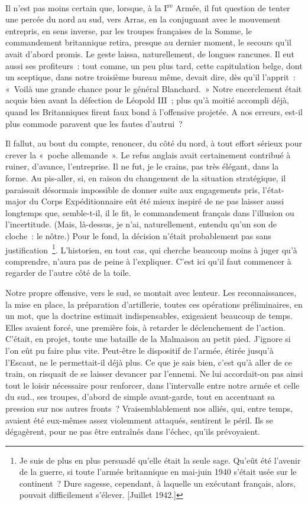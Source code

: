\documentclass[french,twoside]{book} %
\begin{document}
Il n’est pas moins certain que, lorsque, à la I\textsuperscript{re} Armée, il fut question de tenter une percée du nord au sud, vers Arras, en la conjuguant avec le mouvement entrepris, en sens inverse, par les troupes françaises de la Somme, le commandement britannique retira, presque au dernier moment, le secours qu’il avait d’abord promis. Le geste laissa, naturellement, de longues rancunes. Il eut aussi ses profiteurs : tout comme, un peu plus tard, cette capitulation belge, dont un sceptique, dans notre troisième bureau même, devait dire, dès qu’il l’apprit : « Voilà une grande chance pour le général Blanchard. » Notre encerclement était acquis bien avant la défection de Léopold III ; plus qu’à moitié accompli déjà, quand les Britanniques firent faux bond à l’offensive projetée. A nos erreurs, est-il plus commode paravent que les fautes d’autrui ?\par
Il fallut, au bout du compte, renoncer, du côté du nord, à tout effort sérieux pour crever la « poche allemande ». Le refus anglais avait certainement contribué à ruiner, d’avance, l’entreprise. Il ne fut, je le crains, pas très élégant, dans la forme. Au pis-aller, si, en raison du changement de la situation stratégique, il paraissait désormais impossible de donner suite aux engagements pris, l’état-major du Corps Expéditionnaire eût été mieux inspiré de ne pas laisser aussi longtemps que, semble-t-il, il le fit, le commandement français dans l’illusion ou l’incertitude. (Mais, là-dessus, je n’ai, naturellement, entendu qu’un son de cloche : le nôtre.) Pour le fond, la décision n’était probablement pas sans   justification \footnote{Je suis de plus en plus persuadé qu’elle était la seule sage. Qu’eût été l’avenir de la guerre, si toute l’armée britannique en mai-juin 1940 s’était usée sur le continent ? Dure sagesse, cependant, à laquelle un exécutant français, alors, pouvait difficilement s’élever. [Juillet 1942.]}. L’historien, en tout cas, qui cherche beaucoup moins à juger qu’à comprendre, n’aura pas de peine à l’expliquer. C’est ici qu’il faut commencer à regarder de l’autre côté de la toile.\par
Notre propre offensive, vers le sud, se montait avec lenteur. Les reconnaissances, la mise en place, la préparation d’artillerie, toutes ces opérations préliminaires, en un mot, que la doctrine estimait indispensables, exigeaient beaucoup de temps. Elles avaient forcé, une première fois, à retarder le déclenchement de l’action. C’était, en projet, toute une bataille de la Malmaison au petit pied. J’ignore si l’on eût pu faire plus vite. Peut-être le dispositif de l’armée, étirée jusqu’à l’Escaut, ne le permettait-il déjà plus. Ce que je sais bien, c’est qu’à aller de ce train, on risquait de se laisser devancer par l’ennemi. Ne lui accordait-on pas ainsi tout le loisir nécessaire pour renforcer, dans l’intervalle entre notre armée et celle du sud., ses troupes, d’abord de simple avant-garde, tout en accentuant sa pression sur nos autres fronts ? Vraisemblablement nos alliés, qui, entre temps, avaient été eux-mêmes assez violemment attaqués, sentirent le péril. Ils se dégagèrent, pour ne pas être entraînés dans l’échec, qu’ils prévoyaient.\par
\end{document}
